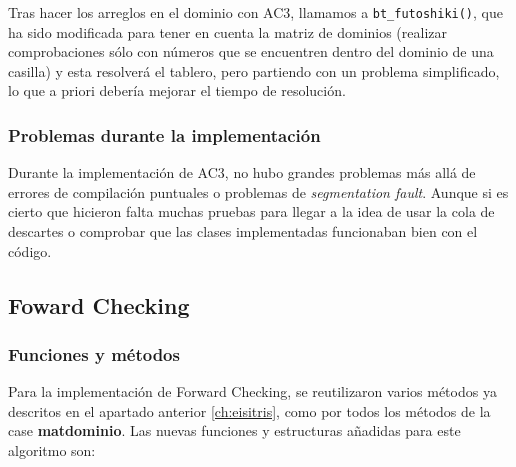 \documentclass[12pt]{article}
\begin{document}
Tras hacer los arreglos en el dominio con AC3, llamamos a  \verb|bt_futoshiki()|, que ha sido
 modificada para tener en cuenta la matriz de dominios (realizar comprobaciones sólo con números que 
 se encuentren dentro del dominio de una casilla) y esta resolverá el tablero, pero partiendo con un problema simplificado, lo que
 a priori debería mejorar el tiempo de resolución.



\subsubsection{Problemas durante la implementación}

Durante la implementación de AC3,  no hubo grandes problemas más allá de errores de compilación puntuales o 
problemas de \textit{segmentation fault}. Aunque si es cierto que hicieron falta muchas pruebas para llegar a la idea
de usar la cola de descartes o comprobar que las clases implementadas funcionaban bien con el código.

\subsection{Foward Checking}

\subsubsection{Funciones y métodos}

Para la implementación de Forward Checking, se reutilizaron varios métodos ya descritos en el apartado anterior \ref{ch:eisitris},
como por todos los métodos de la case \textbf{matdominio}. Las nuevas funciones y estructuras añadidas para este algoritmo son:
\end{document}
